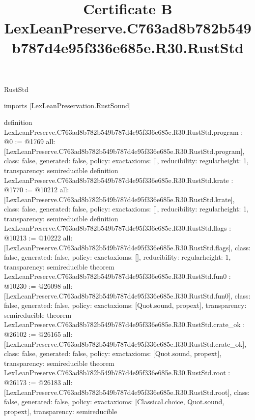 \begin{lexlean}{RustStd}
\title{Certificate B LexLeanPreserve.C763ad8b782b549b787d4e95f336e685e.R30.RustStd}
\begin{coremodule}
imports [LexLeanPreservation.RustSound]

definition LexLeanPreserve.C763ad8b782b549b787d4e95f336e685e.R30.RustStd.program : @0 := @1769 {
  all: [LexLeanPreserve.C763ad8b782b549b787d4e95f336e685e.R30.RustStd.program],
  class: false,
  generated: false,
  policy: exact{axioms: []},
  reducibility: regular{height: 1},
  transparency: semireducible
}
definition LexLeanPreserve.C763ad8b782b549b787d4e95f336e685e.R30.RustStd.krate : @1770 := @10212 {
  all: [LexLeanPreserve.C763ad8b782b549b787d4e95f336e685e.R30.RustStd.krate],
  class: false,
  generated: false,
  policy: exact{axioms: []},
  reducibility: regular{height: 1},
  transparency: semireducible
}
definition LexLeanPreserve.C763ad8b782b549b787d4e95f336e685e.R30.RustStd.flags : @10213 := @10222 {
  all: [LexLeanPreserve.C763ad8b782b549b787d4e95f336e685e.R30.RustStd.flags],
  class: false,
  generated: false,
  policy: exact{axioms: []},
  reducibility: regular{height: 1},
  transparency: semireducible
}
theorem LexLeanPreserve.C763ad8b782b549b787d4e95f336e685e.R30.RustStd.fun0 : @10230 := @26098 {
  all: [LexLeanPreserve.C763ad8b782b549b787d4e95f336e685e.R30.RustStd.fun0],
  class: false,
  generated: false,
  policy: exact{axioms: [Quot.sound, propext]},
  transparency: semireducible
}
theorem LexLeanPreserve.C763ad8b782b549b787d4e95f336e685e.R30.RustStd.crate_ok : @26102 := @26165 {
  all: [LexLeanPreserve.C763ad8b782b549b787d4e95f336e685e.R30.RustStd.crate_ok],
  class: false,
  generated: false,
  policy: exact{axioms: [Quot.sound, propext]},
  transparency: semireducible
}
theorem LexLeanPreserve.C763ad8b782b549b787d4e95f336e685e.R30.RustStd.root : @26173 := @26183 {
  all: [LexLeanPreserve.C763ad8b782b549b787d4e95f336e685e.R30.RustStd.root],
  class: false,
  generated: false,
  policy: exact{axioms: [Classical.choice, Quot.sound, propext]},
  transparency: semireducible
}


\end{coremodule}
\end{lexlean}
